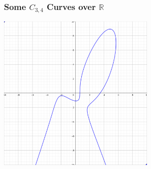 \documentclass{beamer}
\newcommand{\bb}[1]{\mathbb{#1}}
\begin{document}
\begin{frame}
\frametitle{Some $C_{3,4}$ Curves over $\bb R$}
  \begin{center} \includegraphics[height=7.6cm]{curve4.png} \end{center}
\end{frame}

\end{document}

